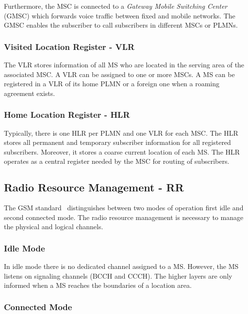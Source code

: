 \documentclass[master,english]{hgbthesis}
\begin{document}
Furthermore, the MSC is connected to a \emph{Gateway Mobile Switching Center} (GMSC) which forwards voice traffic between fixed and mobile networks. The GMSC enables the subscriber to call subscribers in different MSCs or PLMNs.

\subsubsection{Visited Location Register - VLR}

The VLR stores information of all MS who are located in the serving area of the associated MSC. A VLR can be assigned to one or more MSCs. A MS can be registered in a VLR of its home PLMN or a foreign one when a roaming agreement exists.

\subsubsection{Home Location Register - HLR}

Typically, there is one HLR per PLMN and one VLR for each MSC. The HLR stores all permanent and temporary subscriber information for all registered subscribers. Moreover, it stores a coarse current location of each MS. The HLR operates as a central register needed by the MSC for routing of subscribers.

\subsection{Radio Resource Management - RR}

The GSM standard~\cite{Etsi1994} distinguishes between two modes of operation first idle and second connected mode. The radio resource management is necessary to manage the physical and logical channels. 

\subsubsection{Idle Mode}

In idle mode there is no dedicated channel assigned to a MS. However, the MS listens on signaling channels (BCCH and CCCH). The higher layers are only informed when a MS reaches the boundaries of a location area.

\subsubsection{Connected Mode}

\label{subsub:connected}
\end{document}
